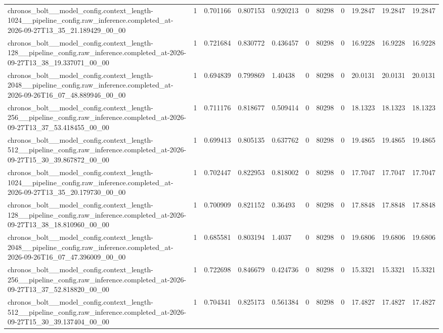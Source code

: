 \begin{tabular}{lllllllllll}
chronos\_bolt\_\_model\_config.context\_length-1024\_\_pipeline\_config.raw\_inference.completed\_at-2026-09-27T13\_35\_21.189429\_00\_00 & 1 & 0.701166 & 0.807153 & 0.920213 & 0 & 80298 & 0 & 19.2847 & 19.2847 & 19.2847 \\
chronos\_bolt\_\_model\_config.context\_length-128\_\_pipeline\_config.raw\_inference.completed\_at-2026-09-27T13\_38\_19.337071\_00\_00 & 1 & 0.721684 & 0.830772 & 0.436457 & 0 & 80298 & 0 & 16.9228 & 16.9228 & 16.9228 \\
chronos\_bolt\_\_model\_config.context\_length-2048\_\_pipeline\_config.raw\_inference.completed\_at-2026-09-26T16\_07\_48.889946\_00\_00 & 1 & 0.694839 & 0.799869 & 1.40438 & 0 & 80298 & 0 & 20.0131 & 20.0131 & 20.0131 \\
chronos\_bolt\_\_model\_config.context\_length-256\_\_pipeline\_config.raw\_inference.completed\_at-2026-09-27T13\_37\_53.418455\_00\_00 & 1 & 0.711176 & 0.818677 & 0.509414 & 0 & 80298 & 0 & 18.1323 & 18.1323 & 18.1323 \\
chronos\_bolt\_\_model\_config.context\_length-512\_\_pipeline\_config.raw\_inference.completed\_at-2026-09-27T15\_30\_39.867872\_00\_00 & 1 & 0.699413 & 0.805135 & 0.637762 & 0 & 80298 & 0 & 19.4865 & 19.4865 & 19.4865 \\
chronos\_bolt\_\_model\_config.context\_length-1024\_\_pipeline\_config.raw\_inference.completed\_at-2026-09-27T13\_35\_20.179730\_00\_00 & 1 & 0.702447 & 0.822953 & 0.818002 & 0 & 80298 & 0 & 17.7047 & 17.7047 & 17.7047 \\
chronos\_bolt\_\_model\_config.context\_length-128\_\_pipeline\_config.raw\_inference.completed\_at-2026-09-27T13\_38\_18.810960\_00\_00 & 1 & 0.700909 & 0.821152 & 0.36493 & 0 & 80298 & 0 & 17.8848 & 17.8848 & 17.8848 \\
chronos\_bolt\_\_model\_config.context\_length-2048\_\_pipeline\_config.raw\_inference.completed\_at-2026-09-26T16\_07\_47.396009\_00\_00 & 1 & 0.685581 & 0.803194 & 1.4037 & 0 & 80298 & 0 & 19.6806 & 19.6806 & 19.6806 \\
chronos\_bolt\_\_model\_config.context\_length-256\_\_pipeline\_config.raw\_inference.completed\_at-2026-09-27T13\_37\_52.818820\_00\_00 & 1 & 0.722698 & 0.846679 & 0.424736 & 0 & 80298 & 0 & 15.3321 & 15.3321 & 15.3321 \\
chronos\_bolt\_\_model\_config.context\_length-512\_\_pipeline\_config.raw\_inference.completed\_at-2026-09-27T15\_30\_39.137404\_00\_00 & 1 & 0.704341 & 0.825173 & 0.561384 & 0 & 80298 & 0 & 17.4827 & 17.4827 & 17.4827 \\

\end{tabular}
